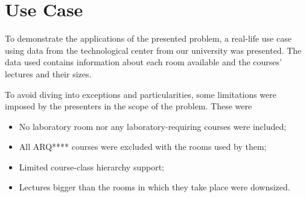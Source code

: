 \section{Use Case}

To demonstrate the applications of the presented problem, a real-life use case using data from the technological center from our university was presented. The data used contains information about each room available and the courses' lectures and their sizes.

To avoid diving into exceptions and particularities, some limitations were imposed by the presenters in the scope of the problem. These were
\begin{itemize}
    \item No laboratory room nor any laboratory-requiring courses were included;
    \item All ARQ**** courses were excluded with the rooms used by them;
    \item Limited course-class hierarchy support;
    \item Lectures bigger than the rooms in which they take place were downsized.
\end{itemize}



